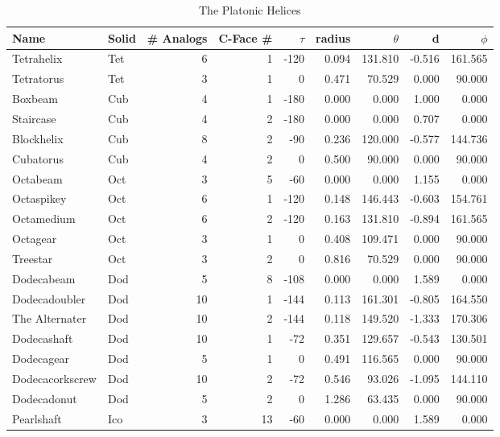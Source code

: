 \documentclass[11pt]{article}
\begin{document}
{\begin{table}[ht]
\caption{The Platonic Helices} %
\centering %
\begin{tabular}{l l r r r r r r r}
  \hline\hline %
  Name & Solid & \# Analogs & C-Face \# & $ \tau $ & radius & $ \theta $ & d & $ \phi $ \\ [0.5ex] %
  \hline %
Tetrahelix & Tet &	6 &	1 &	-120 &	0.094 &	131.810	& -0.516 & 161.565 \\
Tetratorus & Tet & 	3 &	1 &	0    &	0.471 &	70.529	& 0.000	& 90.000 \\
\hline %
Boxbeam & Cub &	4 &	1 &	-180 &	0.000 &	0.000 &	1.000 &	0.000 \\
Staircase & Cub &	4 & 	2 &	-180 &	0.000 &	0.000 &	0.707 &	0.000 \\
Blockhelix & Cub & 	8 & 	2 & 	-90  &	0.236 &	120.000 & -0.577 & 144.736 \\
Cubatorus & Cub &	4 &	2 &	0 &	0.500 &	90.000 & 0.000 & 90.000 \\
\hline %
Octabeam & Oct &	3 &	5 &	-60 &	0.000 &	0.000 &	1.155 &	0.000 \\
Octaspikey & Oct &	6 &	1 &	-120 &	0.148 &	146.443 & -0.603 & 154.761 \\
Octamedium & Oct &	6 &	2 &	-120 &	0.163 &	131.810 & -0.894 & 161.565 \\
Octagear & Oct &	3 &	1 &	0 &	0.408 &	109.471 & 0.000	& 90.000 \\
Treestar & Oct &	3 &	2 &	0 &	0.816 &	70.529 & 0.000 & 90.000 \\
\hline %
Dodecabeam & Dod &	5 &	8 &	-108 &	0.000 &	0.000 &	1.589 &	0.000 \\
Dodecadoubler & Dod &	10 &	1 &	-144 &	0.113 &	161.301 &-0.805 & 164.550 \\
The Alternater & Dod &	10 &	2 &	-144 &	0.118 &	149.520 &-1.333	& 170.306 \\
Dodecashaft & Dod &	10 &	1 &	-72 &	0.351 &	129.657	&-0.543 & 130.501 \\
Dodecagear & Dod &	5 &	1 &	0 &	0.491 &	116.565	& 0.000	& 90.000 \\
Dodecacorkscrew & Dod &	10 &	2 &	-72 &	0.546 &	93.026 & -1.095 & 144.110 \\
Dodecadonut & Dod &	5 &	2 &	0 &	1.286 &	63.435 & 0.000 & 90.000 \\
\hline %
Pearlshaft & Ico &	3 &	13 &	-60 &	0.000 &	0.000 &	1.589 & 0.000 \\

\end{tabular}
\end{table}}
\end{document}
